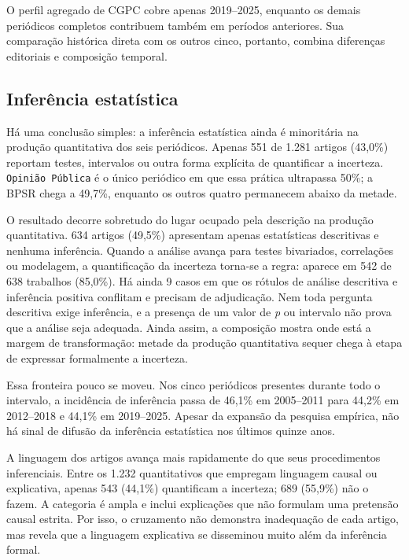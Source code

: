 \documentclass[
]{article}
\begin{document}
O perfil agregado de CGPC cobre apenas 2019--2025, enquanto os demais
periódicos completos contribuem também em períodos anteriores. Sua
comparação histórica direta com os outros cinco, portanto, combina
diferenças editoriais e composição temporal.

\subsection{Inferência estatística}\label{inferuxeancia-estatuxedstica}

Há uma conclusão simples: a inferência estatística ainda é minoritária
na produção quantitativa dos seis periódicos. Apenas 551 de 1.281
artigos (43,0\%) reportam testes, intervalos ou outra forma explícita de
quantificar a incerteza. \texttt{Opinião\ Pública} é o único periódico
em que essa prática ultrapassa 50\%; a BPSR chega a 49,7\%, enquanto os
outros quatro permanecem abaixo da metade.

O resultado decorre sobretudo do lugar ocupado pela descrição na
produção quantitativa. 634 artigos (49,5\%) apresentam apenas
estatísticas descritivas e nenhuma inferência. Quando a análise avança
para testes bivariados, correlações ou modelagem, a quantificação da
incerteza torna-se a regra: aparece em 542 de 638 trabalhos (85,0\%). Há
ainda 9 casos em que os rótulos de análise descritiva e inferência
positiva conflitam e precisam de adjudicação. Nem toda pergunta
descritiva exige inferência, e a presença de um valor de \emph{p} ou
intervalo não prova que a análise seja adequada. Ainda assim, a
composição mostra onde está a margem de transformação: metade da
produção quantitativa sequer chega à etapa de expressar formalmente a
incerteza.

Essa fronteira pouco se moveu. Nos cinco periódicos presentes durante
todo o intervalo, a incidência de inferência passa de 46,1\% em
2005--2011 para 44,2\% em 2012--2018 e 44,1\% em 2019--2025. Apesar da
expansão da pesquisa empírica, não há sinal de difusão da inferência
estatística nos últimos quinze anos.

A linguagem dos artigos avança mais rapidamente do que seus
procedimentos inferenciais. Entre os 1.232 quantitativos que empregam
linguagem causal ou explicativa, apenas 543 (44,1\%) quantificam a
incerteza; 689 (55,9\%) não o fazem. A categoria é ampla e inclui
explicações que não formulam uma pretensão causal estrita. Por isso, o
cruzamento não demonstra inadequação de cada artigo, mas revela que a
linguagem explicativa se disseminou muito além da inferência formal.
\end{document}

